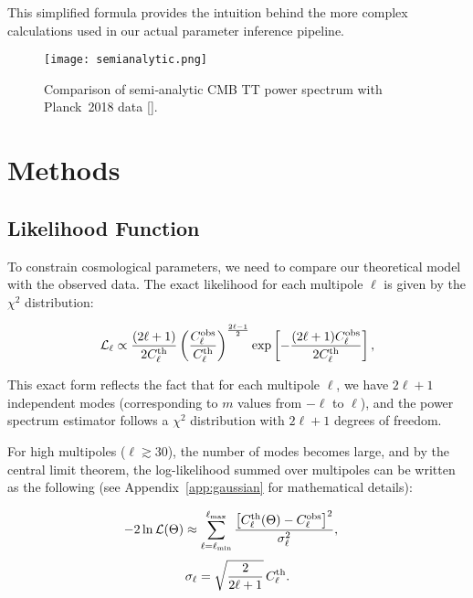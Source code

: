 \documentclass[11pt]{article}
\theoremstyle{definition}
\begin{document}
This simplified formula provides the intuition behind the more complex calculations used in our actual parameter inference pipeline.


\begin{figure}[htbp]
  \centering
  \texttt{[image: semianalytic.png]}
  \caption{Comparison of semi‑analytic CMB TT power spectrum with Planck 2018 data [\cite{planck2018}].}
  \label{fig:cmb-tt-comparison}
\end{figure}

\section{Methods}

\subsection{Likelihood Function}

To constrain cosmological parameters, we need to compare our theoretical model with the observed data. The exact likelihood for each multipole $\ell$ is given by the $\chi^2$ distribution:

\begin{equation}
  \mathcal{L}_\ell \propto \frac{(2\ell+1)}{2C_\ell^{\rm th}} 
  \left(\frac{C_\ell^{\rm obs}}{C_\ell^{\rm th}}\right)^{\frac{2\ell-1}{2}} 
  \exp\left[-\frac{(2\ell+1)C_\ell^{\rm obs}}{2C_\ell^{\rm th}}\right],
\end{equation}

This exact form reflects the fact that for each multipole $\ell$, we have $2\ell+1$ independent modes (corresponding to $m$ values from $-\ell$ to $\ell$), and the power spectrum estimator follows a $\chi^2$ distribution with $2\ell+1$ degrees of freedom. 

For high multipoles ($\ell \gtrsim 30$), the number of modes becomes large, and by the central limit theorem, the log-likelihood summed over multipoles can be written as the following (see Appendix~\ref{app:gaussian} for mathematical details):

\begin{equation}
  -2\ln\mathcal{L}(\Theta)
  \approx \sum_{\ell=\ell_{\min}}^{\ell_{\max}}
    \frac{\bigl[C_\ell^{\rm th}(\Theta)-C_\ell^{\rm obs}\bigr]^2}
         {\sigma_\ell^2},
  \quad
\end{equation}
\begin{equation}
  \sigma_\ell = \sqrt{\frac{2}{2\ell+1}}\,C_\ell^{\rm th}.
\end{equation}
\end{document}
